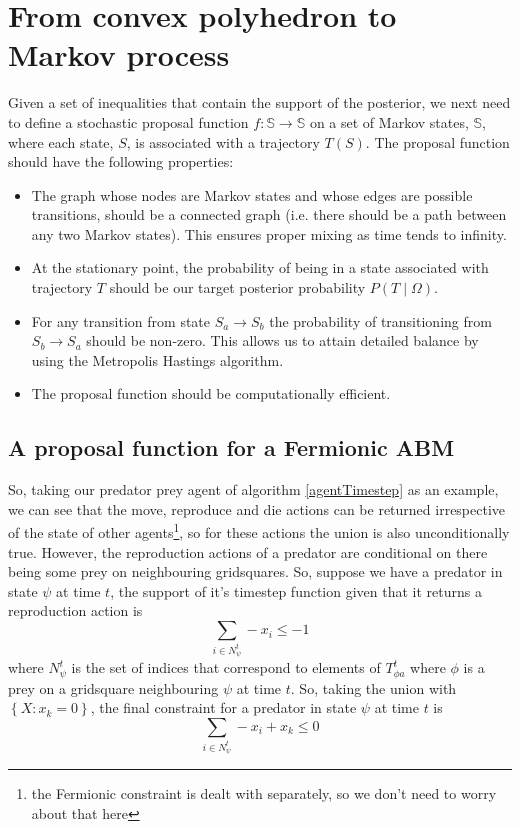 \documentclass{article}
\begin{document}
\section{From convex polyhedron to Markov process}

Given a set of inequalities that contain the support of the posterior, we next need to define a stochastic proposal function $f:\mathbb{S} \to \mathbb{S}$ on a set of Markov states, $\mathbb{S}$, where each state, $S$, is associated with a trajectory $T(S)$. The proposal function should have the following properties:
\begin{itemize}
	\item The graph whose nodes are Markov states and whose edges are possible transitions, should be a connected graph (i.e. there should be a path between any two Markov states). This ensures proper mixing as time tends to infinity.
	
	\item At the stationary point, the probability of being in a state associated with trajectory $T$ should be our target posterior probability $P(T \mid \Omega)$.
	
	\item For any transition from state $S_a \to S_b$ the probability of transitioning from $S_b \to S_a$ should be non-zero. This allows us to attain detailed balance by using the Metropolis Hastings algorithm.
	
	\item The proposal function should be computationally efficient. 
\end{itemize}

\subsection{A proposal function for a Fermionic ABM}
\label{Fermionic}


So, taking our predator prey agent of algorithm \ref{agentTimestep} as an example, we can see that the move, reproduce and die actions can be returned irrespective of the state of other agents\footnote{the Fermionic constraint is dealt with separately, so we don't need to worry about that here}, so for these actions the union is also unconditionally true. However, the reproduction actions of a predator are conditional on there being some prey on neighbouring gridsquares. So, suppose we have a predator in state $\psi$ at time $t$, the support of it's timestep function given that it returns a reproduction action is
\[
\sum_{i \in N^t_\psi} -x_i \le -1
\]
where $N^t_\psi$ is the set of indices that correspond to elements of $T^t_{\phi a}$ where $\phi$ is a prey on a gridsquare neighbouring $\psi$ at time $t$. So, taking the union with $\left\{X: x_k = 0\right\}$, the final constraint for a predator in state $\psi$ at time $t$ is
\[
\sum_{i \in N^t_\psi} -x_i  + x_k  \le 0
\]
\end{document}
